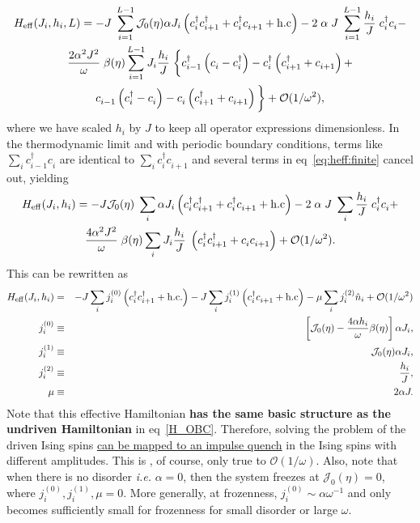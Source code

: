 \documentclass[a4paper,10pt]{article}
\begin{document}
\begin{multline}
\label{eq:heff:finite}
H_{\rm eff}(J_i,h_i,L) = -J\;\sum_{i=1}^{L-1} \mathcal{J}_0(\eta) \alpha J_i \left( c^\dagger_i c^\dagger_{i+1} + 						c^\dagger_i c^{\;}_{i+1} + \rm{h.c} \right) -2 \;\alpha\; J\; \sum_{i=1}^{L-1} \frac{h_i}{J}\; c^\dagger_i c^{\;}_i -\\
\frac{2\alpha^2 J^2}{\omega}\;\beta(\eta)\sum_{i=1}^{L-1} J_i \frac{h_i}{J}\; \bigg\{
 c^\dagger_{i-1}\left(c^{\;}_i - c^\dagger_i\right) - c^\dagger_i\left( c^\dagger_{i+1}+c^{\;}_{i+1} \right) 
 +\\
 c^{\;}_{i-1} \left(c^\dagger_i -c^{\;}_i\right)-c^{\;}_i \left(c^\dagger_{i+1}+c^{\;}_{i+1}\right) 
    \bigg\}+ \mathcal{O}(1/\omega^2),
\end{multline}
where we have scaled $h_i$ by $J$ to keep all operator expressions dimensionless. In the thermodynamic limit and with periodic boundary conditions, terms like $\sum_i c^\dagger_{i-1}c^{\;}_i$ are identical to $\sum_i c^\dagger_i c^{\;}_{i+1}$ and several terms in eq~\ref{eq:heff:finite} cancel out, yielding
\begin{multline}
H_{\rm eff}(J_i,h_i) = -J\mathcal{J}_0(\eta)\;\sum_{i}  \alpha J_i \left( c^\dagger_i c^\dagger_{i+1} + 						c^\dagger_i c^{\;}_{i+1} + \rm{h.c} \right) -2 \;\alpha\; J\; \sum_{i} \frac{h_i}{J}\; c^\dagger_i c^{\;}_i +\\
\frac{4\alpha^2 J^2}{\omega}\;\beta(\eta)\sum_{i} J_i \frac{h_i}{J}\; \left(c^\dagger_i c^\dagger_{i+1}+c^{\;}_ic^{\;}_{i+1}\right)+ \mathcal{O}(1/\omega^2).
\end{multline}
This can be rewritten as
\begin{eqnarray}
\label{eq:heff}
H_{\rm eff}(J_i,h_i) &   =  & -J\sum_i j^{(0)}_i\left(c^\dagger_i c^\dagger_{i+1} + \rm{h.c.}\right) -J\sum_i 							  j^{(1)}_i\left(c^\dagger_i c^{\;}_{i+1}+\rm{h.c}\right)-\mu\sum_i j^{(2)}_i \hat{n}_i 					  +\mathcal{O}(1/\omega^2) \nonumber \\
j^{(0)}_i            &\equiv& \; \left[\mathcal{J}_0(\eta) - \frac{4\alpha h_i}{\omega}\beta(\eta)\right] \alpha J_i,\nonumber \\
j^{(1)}_i            &\equiv& \; \mathcal{J}_0(\eta) \alpha J_i,\nonumber \\
j^{(2)}_i            &\equiv& \frac{h_i}{J},\nonumber \\
\mu 		     &\equiv& 2\alpha J.
\end{eqnarray}
Note that this effective Hamiltonian \textbf{has the same basic structure as the undriven Hamiltonian} in eq~\ref{H_OBC}. Therefore, solving the problem of the driven Ising spins \underline{can be mapped to an impulse quench} 
in the Ising spins with different amplitudes. This is , of course, only true to $\mathcal{O}(1/\omega)$. Also, note that when there is no disorder \textit{i.e.} $\alpha=0$, then the system freezes at $\mathcal{J}_0(\eta)=0$, where $j^{(0)}_i,j^{(1)}_i,\mu = 0$. More generally, at frozenness, $j^{(0)}_i \sim \alpha\omega^{-1}$ and only becomes sufficiently small for frozenness for small disorder or large $\omega$.
\end{document}
